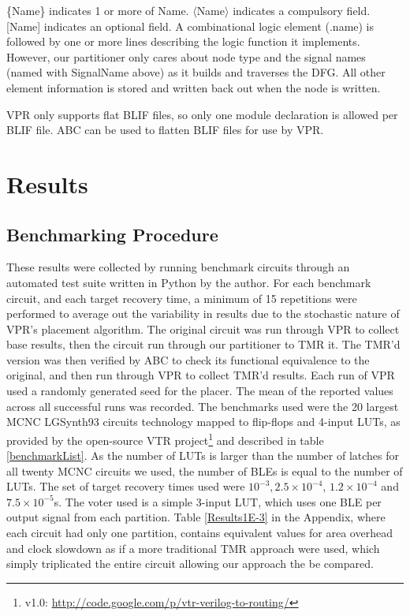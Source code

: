 \documentclass[12pt,final,oneside]{dwThesis} %
\begin{document}
   \{Name\} indicates 1 or more of Name. $\langle$Name$\rangle$ indicates a
   compulsory field. [Name] indicates an optional field.  A combinational logic
   element (.name) is followed by one or more lines describing the logic
   function it implements. However, our partitioner only cares about node type
   and the signal names (named with SignalName above) as it builds and traverses the
   \gls{DFG}. All other element information is stored and written back out when
   the node is written.

   \gls{VPR} only supports flat \gls{BLIF} files, so only one module
   declaration is allowed per \gls{BLIF} file. \gls{ABC} can be used to flatten
   \gls{BLIF} files for use by \gls{VPR}.




   \chapter{Results}\label{results}

   \section{Benchmarking Procedure}
   These results were
   collected by running benchmark circuits through an automated test suite
   written in Python by the author. For each benchmark circuit, and each target
   recovery time, a minimum of 15 repetitions were performed to average out the variability
   in results due to the stochastic nature of \gls{VPR}'s placement algorithm.
   The original circuit was run through \gls{VPR} to collect base results, then the
   circuit run through our partitioner to \gls{TMR} it. The \gls{TMR}'d version was then
   verified by \gls{ABC} to check its functional equivalence to the original,
   and then run through \gls{VPR} to collect \gls{TMR}'d results. Each run of \gls{VPR} used a
   randomly generated seed for the placer.  The mean of the reported values
   across all successful runs was recorded.  The benchmarks used were the 20
   largest \gls{MCNC} LGSynth93 circuits technology mapped to flip-flops and 4-input \glspl{LUT}, as provided by the open-source
   \gls{VTR} project\footnote{v1.0: \url{http://code.google.com/p/vtr-verilog-to-routing/}} and described in table
   \ref{benchmarkList}.
   As the number of \glspl{LUT} is larger than the number of latches for all twenty \gls{MCNC} circuits we used, the number of \glspl{BLE} is equal to the number of \glspl{LUT}.
    The set of target recovery times used were $10^{-3},
   2.5\times10^{-4}$, $1.2\times10^{-4}$ and $7.5\times10^{-5}$s.  The voter used is a simple
   3-input \gls{LUT}, which uses one \gls{BLE} per output signal from each
   partition.
   Table \ref{Results1E-3} in the Appendix, where each circuit had only one partition, contains equivalent values for area overhead and clock slowdown as if a 
   more traditional \gls{TMR} approach were used, which simply triplicated the entire circuit allowing our approach the be compared.
\end{document}
